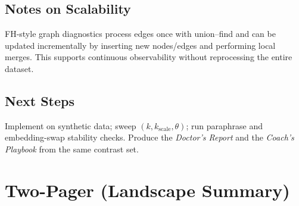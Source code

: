\documentclass[11pt]{article}
\begin{document}
\subsection{Notes on Scalability}
FH-style graph diagnostics process edges once with union--find and can be updated incrementally by inserting new nodes/edges and performing local merges. This supports continuous observability without reprocessing the entire dataset.

\subsection{Next Steps}
Implement on synthetic data; sweep $(k, k_{\mathrm{scale}}, \theta)$; run paraphrase and embedding-swap stability checks. Produce the \emph{Doctor's Report} and the \emph{Coach's Playbook} from the same contrast set.

\section{Two-Pager (Landscape Summary)}
\end{document}
